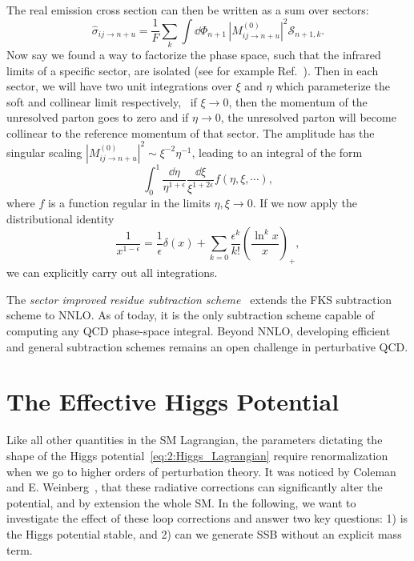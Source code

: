 The real emission cross section can then be written as a sum over sectors:
\begin{equation}
\hat{\sigma}_{ij \rightarrow n+u} = \frac{1}{F} \sum_k \int \dd \Phi_{n + 1} \, |M_{ij \rightarrow n + u}^{(0)}|^2 \mathcal{S}_{n+1, k}.
\end{equation}
Now say we found a way to factorize the phase space, such that the infrared limits of a specific sector, are isolated (see for example Ref.~\cite{Czakon:2019tmo}). Then in each sector, we will have two unit integrations over $\xi$ and $\eta$ which parameterize the soft and collinear limit respectively, \ie\ if $\xi\rightarrow 0$, then the momentum of the unresolved parton goes to zero and if $\eta \rightarrow 0$, the unresolved parton will become collinear to the reference momentum of that sector. The amplitude has the singular scaling $|M_{ij \rightarrow n + u}^{(0)}|^2 \sim \xi^{-2} \eta^{-1}$, leading to an integral of the form
\begin{equation}
\int_0^1 \frac{\dd \eta}{\eta^{1 + \epsilon}} \frac{\dd \xi}{\xi^{1 + 2 \epsilon}} f(\eta, \xi, \cdots),
\end{equation}
where $f$ is a function regular in the limits $\eta, \xi \rightarrow 0$. If we now apply the distributional identity
\begin{equation}
\frac{1}{x^{1 - \epsilon}} = \frac{1}{\epsilon} \delta (x) + \sum_{k = 0} \frac{\epsilon^k}{k!} \left( \frac{\ln^k x}{x} \right)_+,
\label{eq:2:distributional_identity}
\end{equation}
we can explicitly carry out all integrations.

The \textit{sector improved residue subtraction scheme}~\cite{Czakon:2010td} extends the FKS subtraction scheme to \acs{NNLO}. As of today, it is the only subtraction scheme capable of computing any QCD phase-space integral. Beyond \acs{NNLO}, developing efficient and general subtraction schemes remains an open challenge in perturbative QCD.

\section{The Effective Higgs Potential} \label{sec:2:effective_higgs_potential}
Like all other quantities in the \acs{SM} Lagrangian, the parameters dictating the shape of the Higgs potential~\eqref{eq:2:Higgs_Lagrangian} require renormalization when we go to higher orders of perturbation theory. It was noticed by Coleman and E. Weinberg~\cite{Coleman:1973jx}, that these radiative corrections can significantly alter the potential, and by extension the whole \acs{SM}. In the following, we want to investigate the effect of these loop corrections and answer two key questions: 1) is the Higgs potential stable, and 2) can we generate \acs{SSB} without an explicit mass term.

